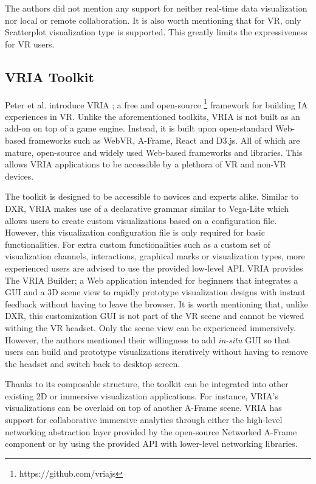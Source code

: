 \documentclass{vgtc}                          %
\begin{document}
\noindent The authors did not mention any support for neither real-time data
visualization nor local or remote collaboration. It is also worth mentioning
that for VR, only Scatterplot visualization type is supported. This greatly
limits the expressiveness for VR users.

\subsection{VRIA Toolkit}
Peter et al. introduce VRIA \cite{vria_framework}; a free and open-source \footnote{https://github.com/vriajs}
framework for building IA experiences in VR. Unlike the aforementioned
toolkits, VRIA is not built as an add-on on top of a game engine. Instead, it is
built upon open-standard Web-based frameworks such as WebVR, A-Frame, React and
D3.js. All of which are mature, open-source and widely used Web-based
frameworks and libraries. This allows VRIA applications to be accessible by a
plethora of VR and non-VR devices.

\smallskip

\noindent The toolkit is designed to be accessible to novices and experts
alike. Similar to DXR, VRIA makes use of a declarative grammar similar to
Vega-Lite \cite{vega_lite} which allows users to create custom visualizations based on a configuration
file. However, this visualization configuration file is only required for
basic functionalities. For extra custom functionalities such as a custom set of
visualization channels, interactions, graphical marks or visualization types,
more experienced users are advised to use the provided low-level API.
VRIA provides The VRIA Builder; a Web application intended for beginners that
integrates a GUI and a 3D scene view to rapidly prototype visualization designs
with instant feedback without having to leave the browser. It is worth
mentioning that, unlike DXR, this customization GUI is not part of the VR scene
and cannot be viewed withing the VR headset. Only the scene view can be
experienced immersively. However, the authors mentioned their willingness to
add \textit{in-situ} GUI so that users can build and prototype visualizations
iteratively without having to remove the headset and switch back to desktop
screen.

\smallskip

\noindent Thanks to its composable structure, the toolkit can be integrated into
other existing 2D or immersive visualization applications. For instance,
VRIA's visualizations can be overlaid on top of another A-Frame scene.
VRIA has support for collaborative immersive analytics through either the
high-level networking abstraction layer provided by the open-source Networked
A-Frame component or by using the provided API with lower-level networking
libraries.
\end{document}
